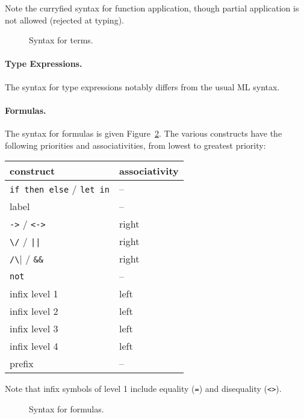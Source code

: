 Note the curryfied syntax for function application, though partial
application is not allowed (rejected at typing).

\begin{figure}
  \begin{center}\framebox{}\end{center}
  \caption{Syntax for terms.}
\label{fig:bnf:term}
\end{figure}

\paragraph{Type Expressions.} The syntax for type
expressions notably differs from the usual ML syntax.
\begin{center}\framebox{}\end{center}

\paragraph{Formulas.}
The syntax for formulas is given Figure~\ref{fig:bnf:formula}.
The various constructs have the following priorities and
associativities, from lowest to greatest priority:
\begin{center}
  \begin{tabular}{|l|l|}
    \hline
    construct & associativity \\
    \hline\hline
    \texttt{if then else} / \texttt{let in} & -- \\
    label & -- \\
    \texttt{->} / \texttt{<->} & right \\
    \verb!\/! / \verb!||! & right \\
    \verb|/\| / \verb!&&! & right \\
    \texttt{not}  & -- \\
    infix level 1 & left \\
    infix level 2 & left \\
    infix level 3 & left \\
    infix level 4 & left \\
    prefix        & --   \\
    \hline
  \end{tabular}
\end{center}
Note that infix symbols of level 1 include equality (\texttt{=}) and
disequality (\texttt{<>}).

\begin{figure}
  \begin{center}\framebox{}\end{center}
  \caption{Syntax for formulas.}
\label{fig:bnf:formula}
\end{figure}

